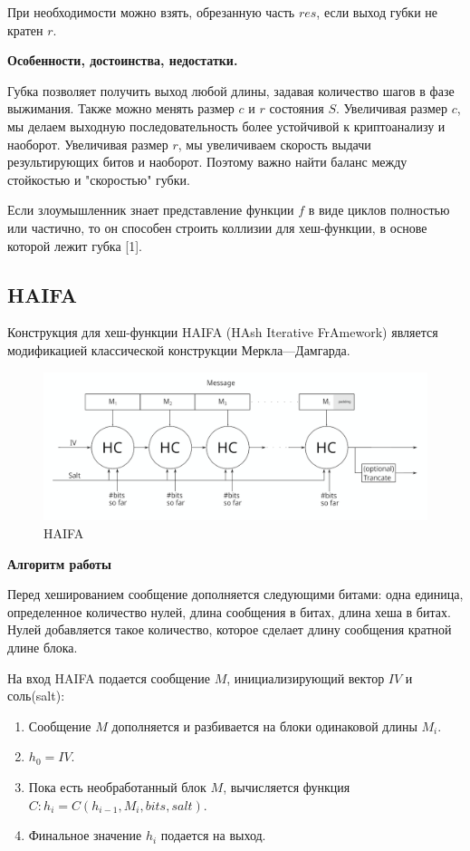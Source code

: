 \documentclass[colorthm]{./civarticle}
\begin{document}
При необходимости можно взять, обрезанную часть $res$, если выход губки не кратен $r$.

\textbf{Особенности, достоинства, недостатки.}

Губка позволяет получить выход любой длины, задавая количество шагов в фазе выжимания. Также можно менять размер $c$ и $r$ состояния $S$. Увеличивая размер $c$, мы делаем выходную последовательность более устойчивой к криптоанализу и наоборот. Увеличивая размер $r$, мы увеличиваем скорость выдачи результирующих битов и наоборот. Поэтому важно найти баланс между стойкостью и "скоростью" губки. 

Если злоумышленник знает представление функции $f$ в виде циклов полностью или частично, то он способен строить коллизии для хеш-функции, в основе которой лежит губка [1].

\subsection{HAIFA}

Конструкция для хеш-функции HAIFA (HAsh Iterative FrAmework) является модификацией классической конструкции Меркла—Дамгарда.

\begin{figure}[H]
    \centering
    \includegraphics[width=0.75\linewidth]{kglcf.png}
    \caption{HAIFA}
    \label{fig:enter-label}
\end{figure}

\textbf{Алгоритм работы}

Перед хешированием сообщение дополняется следующими битами: одна единица, определенное количество нулей, длина сообщения в битах, длина хеша в битах. Нулей добавляется такое количество, которое сделает длину сообщения кратной длине блока.

На вход HAIFA подается сообщение $M$, инициализирующий вектор $IV$ и соль(salt):

\begin{enumerate}
    \item Сообщение $M$ дополняется и разбивается на блоки одинаковой длины $M_i$.
    \item $h_0 = IV$.
    \item Пока есть необработанный блок $M$, вычисляется функция $C: h_i = C(h_{i-1}, M_i, bits, salt)$.
    \item Финальное значение $h_i$ подается на выход.
\end{enumerate}
\end{document}
